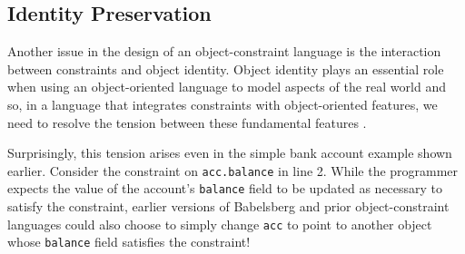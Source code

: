 \documentclass[10pt,reprint]{sigplanconf-preprint}
\begin{document}

\subsection{Identity Preservation}

Another issue in the design of an object-constraint language is the
interaction between constraints and object identity.  Object identity
plays an essential role when using an object-oriented language to
model aspects of the real world and so, in a language that integrates
constraints with object-oriented features, we need to resolve the
tension between these fundamental features \cite{lopez-ecoop-1994}.

Surprisingly, this tension arises even in the simple bank account
example shown earlier.  Consider the constraint on \verb!acc.balance!
in line 2.  While the programmer expects the value of the account's
\verb!balance! field to be updated as necessary to satisfy the
constraint, earlier versions of Babelsberg and prior object-constraint
languages could also choose to simply
change \verb!acc! to point to another object whose \verb!balance!
field satisfies the constraint!
\end{document}
